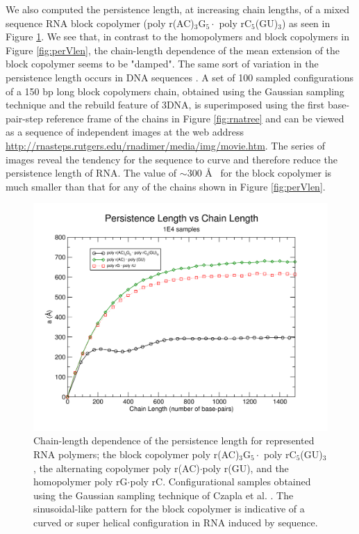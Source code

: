 We also computed the  persistence length, at increasing chain lengths,
of     a    mixed     sequence    RNA     block     copolymer    (poly
r(AC)$_{\text{3}}$G$_{\text{5}}  \cdot$  poly  rC$_{5}$(GU)$_{3}$)  as
seen  in Figure  \ref{fig:curved}.  We  see that,  in contrast  to the
homopolymers  and block  copolymers in  Figure  \ref{fig:perVlen}, the
chain-length dependence  of the mean extension of  the block copolymer
seems to be  "damped".  The same sort of  variation in the persistence
length  occurs in  DNA  sequences \cite{maroun1988b}.   A  set of  100
sampled  configurations  of a  150  bp  long  block copolymers  chain,
obtained using the Gaussian sampling technique and the rebuild feature
of  3DNA, is  superimposed  using the  first base-pair-step  reference
frame of the chains in Figure \ref{fig:rnatree} and can be viewed as a
sequence    of    independent    images    at    the    web    address
\url{http://rnasteps.rutgers.edu/rnadimer/media/img/movie.htm}.     The
series of  images reveal  the tendency for  the sequence to  curve and
therefore reduce the persistence length of RNA. The value of $\sim$300
\AA~ for the block copolymer is  much smaller than that for any of the
chains shown in Figure \ref{fig:perVlen}.

\begin{figure}
\centering
\includegraphics[angle=0, scale=0.61]{Chapter4/curved_and_steps.png}
\caption{Chain-length  dependence   of  the  persistence   length  for
  represented    RNA    polymers;    the    block    copolymer    poly
  r(AC)$_{\text{3}}$G$_{\text{5}}\cdot$                            poly
  rC$_{\text{5}}$(GU)$_{\text{3}}$,  the  alternating  copolymer  poly
  r(AC)$\cdot$poly r(GU),  and the homopolymer  poly rG$\cdot$poly rC.
  Configurational  samples   obtained  using  the   Gaussian  sampling
  technique of  Czapla et al.   \cite{czapla2006}. The sinusoidal-like
  pattern for the  block copolymer is indicative of  a curved or super
  helical configuration in RNA induced by sequence.}
\label{fig:curved}
\end{figure}

